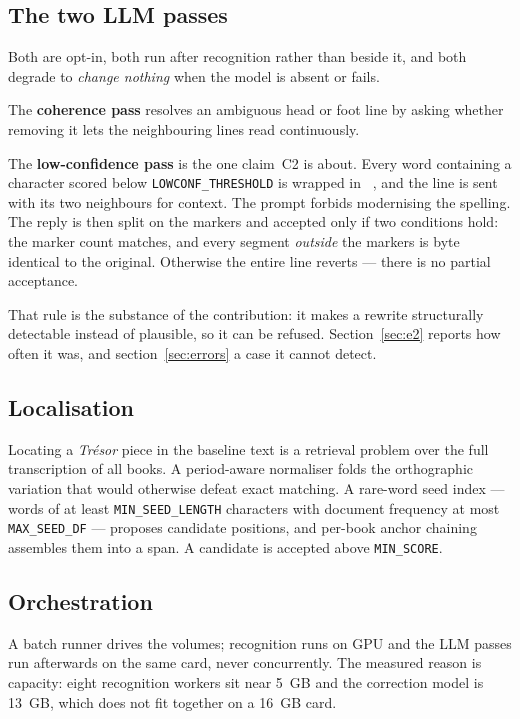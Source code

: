 \subsection{The two LLM passes}

Both are opt-in, both run after recognition rather than beside it, and both
degrade to \emph{change nothing} when the model is absent or fails.

The \textbf{coherence pass} resolves an ambiguous head or foot line by asking
whether removing it lets the neighbouring lines read continuously.

The \textbf{low-confidence pass} is the one claim~C2 is about. Every word
containing a character scored below \texttt{LOWCONF\_THRESHOLD} is wrapped in
\lmark~\rmark{}, and the line is sent with its two neighbours for context. The
prompt forbids modernising the spelling. The reply is then split on the markers
and accepted only if two conditions hold: the marker count matches, and every
segment \emph{outside} the markers is byte identical to the original.
Otherwise the entire line reverts --- there is no partial acceptance.

That rule is the substance of the contribution: it makes a rewrite structurally
detectable instead of plausible, so it can be refused. Section~\ref{sec:e2}
reports how often it was, and section~\ref{sec:errors} a case it cannot
detect.

\subsection{Localisation}

Locating a \emph{Trésor} piece in the baseline text is a retrieval problem over
the full transcription of all \ocrBooks{} books. A period-aware normaliser
folds the orthographic variation that would otherwise defeat exact matching.
A rare-word seed index --- words of at least \texttt{MIN\_SEED\_LENGTH}
characters with document frequency at most \texttt{MAX\_SEED\_DF} --- proposes
candidate positions, and per-book anchor chaining assembles them into a span.
A candidate is accepted above \texttt{MIN\_SCORE}.

\subsection{Orchestration}

A batch runner drives the volumes; recognition runs on GPU and the LLM passes
run afterwards on the same card, never concurrently. The measured reason is
capacity: eight recognition workers sit near 5~GB and the correction model is
13~GB, which does not fit together on a 16~GB card.

